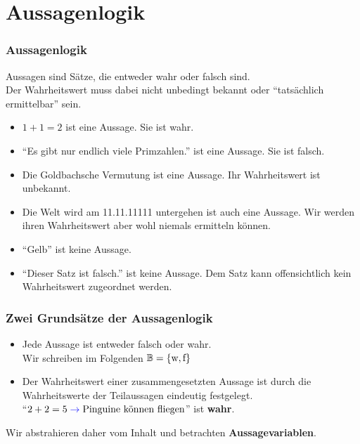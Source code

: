 \section{Aussagenlogik}

\begin{frame}
	\frametitle{Aussagenlogik}
	Aussagen sind Sätze, die entweder wahr oder falsch sind.\\
	Der Wahrheitswert muss dabei nicht unbedingt bekannt oder \enquote{tatsächlich ermittelbar} sein.
	
	\pause
	\begin{Beispiel}
		\begin{itemize}
			\item $ 1 + 1 = 2 $ ist eine Aussage. Sie ist wahr.
			\item \enquote{Es gibt nur endlich viele Primzahlen.} ist eine Aussage. Sie ist falsch.
			\pause
			\item Die Goldbachsche Vermutung ist eine Aussage. Ihr Wahrheitswert ist unbekannt.
			\pause
			\item Die Welt wird am 11.11.11111 untergehen ist auch eine Aussage. Wir werden ihren Wahrheitswert aber wohl niemals ermitteln können.
			\pause
			\item \enquote{Gelb} ist keine Aussage.
			\pause
			\item \enquote{Dieser Satz ist falsch.} ist keine Aussage. Dem Satz kann offensichtlich kein Wahrheitswert zugeordnet werden.
		\end{itemize}
	\end{Beispiel}
\end{frame}

\begin{frame}
	\frametitle{Zwei Grundsätze der Aussagenlogik}
	
	\begin{itemize}
		\pause
		\item Jede Aussage ist entweder falsch oder wahr.\\
		Wir schreiben im Folgenden $\mathbb{B} = \{\text{w}, \text{f}\}$
		\pause
		\item Der Wahrheitswert einer zusammengesetzten Aussage ist durch die
		Wahrheitswerte der Teilaussagen eindeutig festgelegt. \\
		\enquote{$2 + 2 = 5 \; \textcolor{blue}{\to}\text{} \; \text{Pinguine können fliegen}$} ist \textbf{wahr}.\\[0.2em]
	\end{itemize}

	Wir abstrahieren daher vom Inhalt und betrachten \textbf{Aussagevariablen}.
\end{frame}

